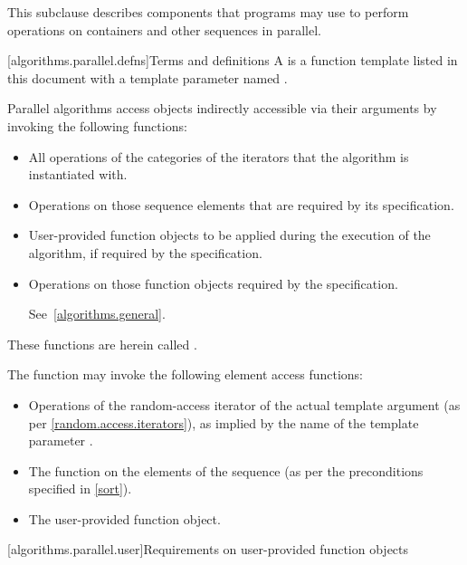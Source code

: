 \pnum
This subclause describes components that \Cpp{} programs may use to perform
operations on containers and other sequences in parallel.

[algorithms.parallel.defns]{Terms and definitions}
\pnum
A  is a function template listed in this document with
a template parameter named .

\pnum
Parallel algorithms access objects indirectly accessible via their arguments by
invoking the following functions:

\begin{itemize}
\item
All operations of the categories of the iterators that the algorithm is
instantiated with.

\item
Operations on those sequence elements that are required by its specification.

\item
User-provided function objects to be applied during the execution of the
algorithm, if required by the specification.

\item
Operations on those function objects required by the specification.
\begin{note} See~\ref{algorithms.general}.\end{note}
\end{itemize}

These functions are herein called .
\begin{example}
The  function may invoke the following element access functions:

\begin{itemize}
\item
Operations of the random-access iterator of the actual template argument
(as per \ref{random.access.iterators}),
as implied by the name of the template parameter .

\item
The  function on the elements of the sequence (as per the
preconditions specified in \ref{sort}).

\item
The user-provided  function object.
\end{itemize}
\end{example}

[algorithms.parallel.user]{Requirements on user-provided function objects}

